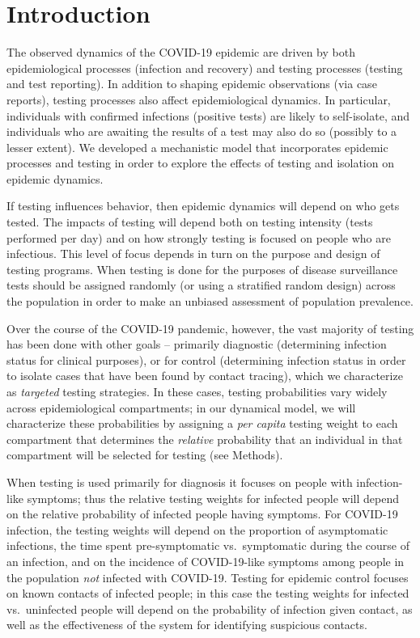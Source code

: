 \documentclass[12pt]{article}
\newcommand{\percap}{\emph{per capita}\xspace}
\newcommand{\covid}{COVID-19\xspace}
\DeclareRobustCommand\_{\ifmmode\expandafter\subtxt\else\textunderscore\fi}
\theoremstyle{definition} %
\begin{document}
\section{Introduction}

The observed dynamics of the \covid epidemic are driven by both epidemiological processes (infection and recovery) and testing processes (testing and test reporting). In addition to shaping epidemic observations (via case reports), testing processes also affect epidemiological dynamics. In particular, individuals with confirmed infections (positive tests) are likely to self-isolate, and individuals who are awaiting the results of a test may also do so (possibly to a lesser extent). We developed a mechanistic model that incorporates epidemic processes and testing in order to explore the effects of testing and isolation on epidemic dynamics.

If testing influences behavior, then epidemic dynamics will depend on who gets tested.
The impacts of testing will depend both on testing intensity (tests performed per day) and on how strongly testing is focused on people who are infectious.
This level of focus depends in turn on the purpose and design of testing programs. 
When testing is done for the purposes of disease surveillance \citep{foddai2020base}
tests should be assigned randomly (or using a stratified random design) across the population in
order to make an unbiased assessment of population prevalence.

Over the course of the \covid pandemic, however, the vast majority of testing has been done with other goals --
primarily diagnostic (determining infection status for clinical purposes), or for control (determining  infection status in order to isolate cases that have been found by contact tracing), which we characterize as \emph{targeted} testing strategies.
In these cases, testing probabilities vary widely across epidemiological compartments; in our dynamical model, we will characterize these probabilities by assigning a \percap testing weight to each compartment that determines the \emph{relative} probability that an individual in that compartment will be selected for testing (see Methods). 

When testing is used primarily for diagnosis it focuses on people with infection-like symptoms; thus the relative testing weights for infected people will depend on the relative probability of infected people having symptoms. For \covid infection, the testing weights will depend on the proportion of asymptomatic infections, the time spent pre-symptomatic vs.\ symptomatic during the course of an infection, and on the incidence of \covid-like symptoms among people in the population \emph{not} infected with \covid. Testing for epidemic control focuses on known contacts of infected people; in this case the testing weights for infected vs.\ uninfected people will depend on the probability of infection given contact, as well as the effectiveness of the system for identifying suspicious contacts.
\end{document}
